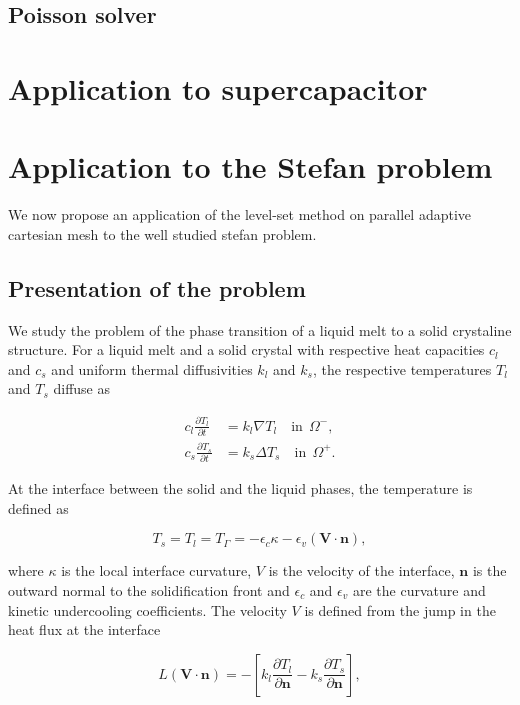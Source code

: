 \documentclass{elsarticle}
\newcommand{\pd}[2]{\frac{\partial #1}{\partial #2}}
\begin{document}
\subsection{Poisson solver}

\section{Application to supercapacitor}

\section{Application to the Stefan problem}

We now propose an application of the level-set method on parallel adaptive cartesian mesh to the well studied stefan problem.

\subsection{Presentation of the problem}

We study the problem of the phase transition of a liquid melt to a solid crystaline structure. For a liquid melt and a solid crystal with respective heat capacities $c_l$ and $c_s$ and uniform thermal diffusivities $k_l$ and $k_s$, the respective temperatures $T_l$ and $T_s$ diffuse as

\begin{align*}
c_l \pd{T_l}{t} & = k_l \nabla T_l \quad \mathrm{in} ~~ \Omega^- , \\
c_s \pd{T_s}{t} & = k_s \Delta T_s \quad \mathrm{in} ~~ \Omega^+ .
\end{align*}

At the interface between the solid and the liquid phases, the temperature is defined as

\begin{equation*}
T_s = T_l = T_{\Gamma} = -\epsilon_c \kappa - \epsilon_v (\mathbf{V} \cdot \mathbf{n}),
\end{equation*}

where $\kappa$ is the local interface curvature, $V$ is the velocity of the interface, $\mathbf{n}$ is the outward normal to the solidification front and $\epsilon_c$ and $\epsilon_v$ are the curvature and kinetic undercooling coefficients. The velocity $V$ is defined from the jump in the heat flux at the interface

\begin{equation}
L (\mathbf{V} \cdot \mathbf{n}) = - \left[ k_l \pd{T_l}{\mathbf{n}} - k_s \pd{T_s}{\mathbf{n}} \right],
\end{equation}
\end{document}
